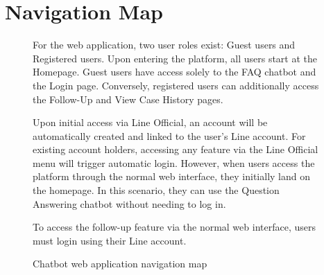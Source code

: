 \documentclass[12pt,oneside,openright,a4paper]{cpe-english-project}
\begin{document}
  \section{Navigation Map}
    \begin{figure}[!h]
      \centering
      \caption{Chatbot web application navigation map}\label{fig:Navigation_Map}
      \begin{flushleft}
        \qquad For the web application, two user roles exist: Guest users and Registered users. Upon entering the platform, all users start at the Homepage. Guest users have access solely to the FAQ chatbot and the Login page. Conversely, registered users can additionally access the Follow-Up  and View Case History pages.  \par
        \qquad Upon initial access via Line Official, an account will be automatically created and linked to the user’s Line account. For existing account holders, accessing any feature via the Line Official menu will trigger automatic login. However, when users access the platform through the normal web interface, they initially land on the homepage. In this scenario, they can use the Question Answering chatbot without needing to log in.  \par
        \qquad To access the follow-up feature via the normal web interface, users must login using their Line account. \par
      \end{flushleft}
    \end{figure}
\end{document}
